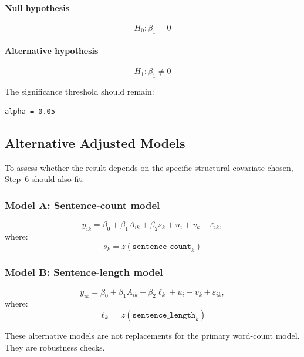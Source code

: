 \documentclass[11pt]{article}
\begin{document}
\paragraph{Null hypothesis}
\begin{equation}
H_0: \beta_1 = 0
\end{equation}

\paragraph{Alternative hypothesis}
\begin{equation}
H_1: \beta_1 \neq 0
\end{equation}

The significance threshold should remain:
\begin{verbatim}
alpha = 0.05
\end{verbatim}

\subsection{Alternative Adjusted Models}
To assess whether the result depends on the specific structural covariate chosen, Step~6 should also fit:

\subsubsection{Model A: Sentence-count model}
\begin{equation}
y_{ik}
=
\beta_0
+
\beta_1 A_{ik}
+
\beta_2 s_k
+
u_i
+
v_k
+
\varepsilon_{ik},
\end{equation}
where:
\begin{equation}
s_k = z(\texttt{sentence\_count}_k)
\end{equation}

\subsubsection{Model B: Sentence-length model}
\begin{equation}
y_{ik}
=
\beta_0
+
\beta_1 A_{ik}
+
\beta_2 \ell_k
+
u_i
+
v_k
+
\varepsilon_{ik},
\end{equation}
where:
\begin{equation}
\ell_k = z(\texttt{sentence\_length}_k)
\end{equation}

These alternative models are not replacements for the primary word-count model.
They are robustness checks.
\end{document}
